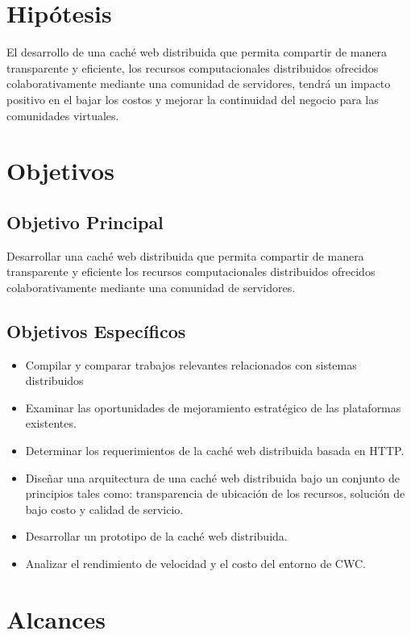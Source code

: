 \section{Hipótesis}
El desarrollo de una caché web distribuida que permita compartir de manera transparente y eficiente, los recursos computacionales distribuidos ofrecidos colaborativamente mediante una comunidad de servidores, tendrá un impacto positivo en el bajar los costos y mejorar la continuidad del negocio para las comunidades virtuales.

\section{Objetivos}
\subsection{Objetivo Principal}
Desarrollar una caché web distribuida que permita compartir de manera transparente y eficiente los recursos computacionales distribuidos ofrecidos colaborativamente mediante una comunidad de servidores.

\subsection{Objetivos Específicos}
\begin{itemize}
\item Compilar y comparar trabajos relevantes relacionados con sistemas distribuidos
\item Examinar las oportunidades de mejoramiento estratégico de las plataformas existentes.
\item Determinar los requerimientos de la caché web distribuida basada en HTTP.
\item Diseñar una arquitectura de una caché web distribuida bajo un conjunto de principios tales como: transparencia de ubicación de los recursos, solución de bajo costo y calidad de servicio.
\item Desarrollar un prototipo de la caché web distribuida.
\item Analizar el rendimiento de velocidad y el costo del entorno de CWC.
\end{itemize}

\section{Alcances}

